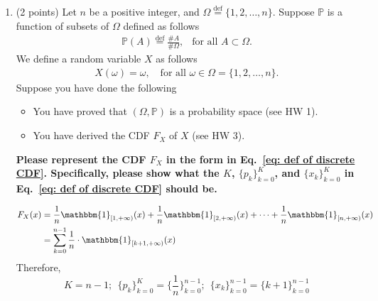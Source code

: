\documentclass[11pt]{article}
\newcommand{\1}{\mathbbm{1}}
\begin{document}
\begin{enumerate}

\item (2 points) Let $n$ be a positive integer, and $\Omega \overset{\operatorname{def}}{=}\{1,2,\ldots,n\}$. Suppose $\mathbb{P}$ is a function of subsets of $\Omega$ defined as follows
\begin{align*}
\mathbb{P}(A)\overset{\operatorname{def}}{=}\frac{\# A}{\#\Omega}, \ \ \text{ for all }A\subset \Omega.
\end{align*}
We define a random variable $X$ as follows
\begin{align*}
    X(\omega)=\omega,\ \ \ \text{ for all }\omega\in\Omega=\{1,2,\ldots,n\}.
\end{align*}
Suppose you have done the following
\begin{itemize}
    \item You have proved that $(\Omega,\mathbb{P})$ is a probability space (see HW 1).
    \item You have derived the CDF $F_X$ of $X$ (see HW 3).
\end{itemize}

\textbf{Please represent the CDF $F_X$ in the form in Eq.~\eqref{eq: def of discrete CDF}. Specifically, please show what the $K$, $\{p_k\}_{k=0}^K$, and $\{x_k\}_{k=0}^K$ in Eq.~\eqref{eq: def of discrete CDF} should be.}

\begin{align*}
        F_X(x)&=\frac{1}{n}\1_{[1,+\infty)}(x)+\frac{1}{n}\1_{[2,+\infty)}(x)+\cdots + \frac{1}{n}\1_{[n,+\infty)}(x)\\
        &= \sum_{k=0}^{n-1}\frac{1}{n}\cdot \1_{[k+1,+\infty)}(x)
\end{align*}
Therefore, 
\[K=n-1;\ \ \{p_k\}^K_{k=0}=\{\frac{1}{n}\}^{n-1}_{k=0};\ \ \{x_k\}_{k=0}^{n-1}=\{k+1\}^{n-1}_{k=0}\]


\end{enumerate}
\end{document}
